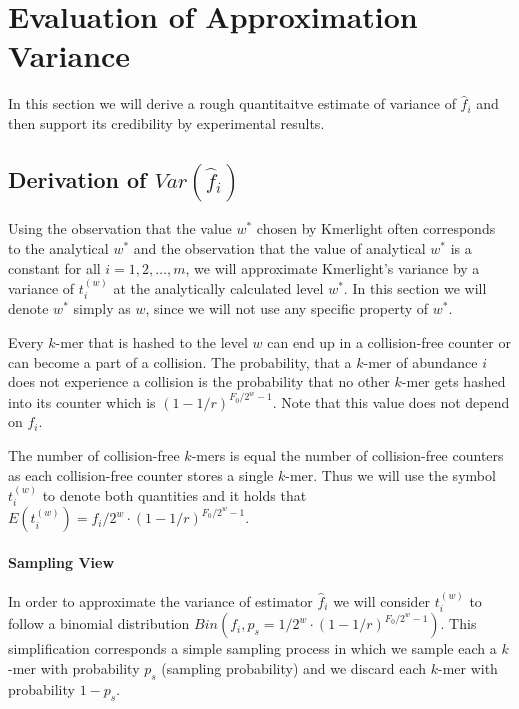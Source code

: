 \section{Evaluation of Approximation Variance}
\label{sec:estimation-variance}

In this section we will derive a rough quantitaitve estimate of variance of $ \hat f_i$
and then support its credibility by experimental results.

\subsection{Derivation of $Var(\hat f_i)$}
Using the observation that the value $w^*$ chosen by Kmerlight often corresponds
to the analytical $w^*$ and the observation that the value of analytical $w^*$ is a constant
for all $i=1, 2, \dots, m$, we will approximate Kmerlight's variance by a variance
of $t_i^{(w)}$ at the analytically calculated level $w^*$. In this section we will denote
$w^*$ simply as $w$, since we will not use any specific property of $w^*$.

Every $k$-mer that is hashed to the level $w$ can end up 
in a collision-free counter or can become a part of a collision.
The probability, that a $k$-mer of abundance $i$ does not experience a collision is
the probability that no other $k$-mer gets hashed into its counter which is
$(1 - 1/r)^{F_0/2^w-1}$. Note that this value does not depend on $f_i$.

The number of collision-free $k$-mers is equal the number of collision-free counters
as each collision-free counter stores a single $k$-mer. Thus we will use the symbol
$t_i^{(w)}$ to denote both quantities and it holds that 
$E(t_i^{(w)}) = f_i/2^w \cdot (1 - 1/r)^{F_0/2^w-1}$.

% 

\paragraph{Sampling View}
In order to approximate the variance of estimator $\hat f_i$ we will consider
$t_i^{(w)}$ to follow a binomial distribution $Bin(f_i, p_s = 1/2^w \cdot (1 - 1/r)^{F_0/2^w-1})$.
This simplification corresponds a simple sampling process in which we sample each a $k$-mer
with probability $p_s$ (sampling probability) and we discard each $k$-mer
with probability $1 - p_s$.

